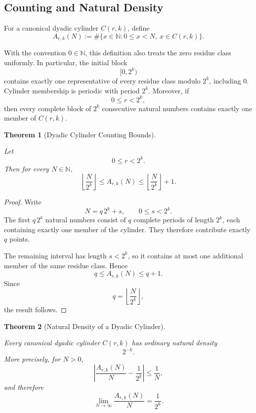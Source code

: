 \documentclass[12pt, oneside]{article}
\numberwithin{equation}{section}
\theoremstyle{definition}
\theoremstyle{plain}
\newtheorem{theorem}{Theorem}[section]
\theoremstyle{remark}
\begin{document}
\subsection{Counting and Natural Density}

For a canonical dyadic cylinder \(C(r,k)\), define
\[
A_{r,k}(N)
:=
\#\{x\in\mathbb N:0\le x<N,\ x\in C(r,k)\}.
\]

With the convention \(0\in\mathbb N\), this definition also treats the
zero residue class uniformly. In particular, the initial block
\[
[0,2^k)
\]
contains exactly one representative of every residue class modulo \(2^k\),
including \(0\). Cylinder membership is periodic with period \(2^k\).
Moreover, if
\[
0\le r<2^k,
\]
then every complete block of \(2^k\) consecutive natural numbers contains
exactly one member of \(C(r,k)\).

\begin{theorem}[Dyadic Cylinder Counting Bounds]
\label{thm:dyadic-cylinder-counting}

Let
\[
0\le r<2^k.
\]
Then for every \(N\in\mathbb N\),
\[
\left\lfloor\frac{N}{2^k}\right\rfloor
\le
A_{r,k}(N)
\le
\left\lfloor\frac{N}{2^k}\right\rfloor+1.
\]
\end{theorem}

\begin{proof}
Write
\[
N=q\,2^k+s,
\qquad
0\le s<2^k.
\]
The first \(q\,2^k\) natural numbers consist of \(q\) complete periods of
length \(2^k\), each containing exactly one member of the cylinder.
They therefore contribute exactly \(q\) points.

The remaining interval has length \(s<2^k\), so it contains at most one
additional member of the same residue class. Hence
\[
q\le A_{r,k}(N)\le q+1.
\]
Since
\[
q=\left\lfloor\frac{N}{2^k}\right\rfloor,
\]
the result follows.
\end{proof}

\begin{theorem}[Natural Density of a Dyadic Cylinder]
\label{thm:dyadic-cylinder-density}

Every canonical dyadic cylinder \(C(r,k)\) has ordinary natural density
\[
2^{-k}.
\]
More precisely, for \(N>0\),
\[
\left|
\frac{A_{r,k}(N)}{N}
-
\frac{1}{2^k}
\right|
\le
\frac{1}{N},
\]
and therefore
\[
\lim_{N\to\infty}
\frac{A_{r,k}(N)}{N}
=
\frac{1}{2^k}.
\]
\end{theorem}
\end{document}

